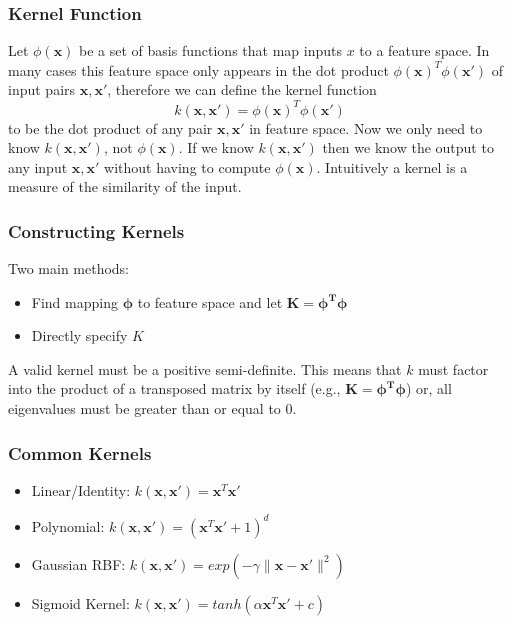 \documentclass[12pt]{article}
\begin{document}
        \subsubsection{Kernel Function}
            Let $\phi(\boldsymbol{x})$ be a set of basis functions that map inputs $x$ to a feature space. In many cases
            this feature space only appears in the dot product $\phi(\boldsymbol{x})^T \phi(\boldsymbol{x}')$ of input
            pairs $\boldsymbol{x}, \boldsymbol{x}'$, therefore we can define the kernel function
            $$ k(\boldsymbol{x}, \boldsymbol{x}') = \phi(\boldsymbol{x})^T \phi(\boldsymbol{x}') $$
            to be the dot product of any pair  $\boldsymbol{x}, \boldsymbol{x}'$ in feature space. Now we only need to
            know $k(\boldsymbol{x}, \boldsymbol{x}')$, not $\phi(\boldsymbol{x})$. If we know $k(\boldsymbol{x},
            \boldsymbol{x}')$ then we know the output to any input $\boldsymbol{x}, \boldsymbol{x}'$ without having to
            compute $\phi(\boldsymbol{x})$. Intuitively a kernel is a measure of the similarity of the input.

        \subsubsection{Constructing Kernels}
            Two main methods:
            \begin{itemize}
                \item Find mapping $\boldsymbol{\phi}$ to feature space and let $\boldsymbol{K = \phi^T \phi}$
                \item Directly specify $K$
            \end{itemize}

            A valid kernel must be a positive semi-definite. This means that $k$ must factor into the product of a
            transposed matrix by itself (e.g., $\boldsymbol{K = \phi^T \phi}$) or, all eigenvalues must be greater than
            or equal to 0.
            
        \subsubsection{Common Kernels}
            \begin{itemize}
                \item Linear/Identity: $k(\boldsymbol{x}, \boldsymbol{x}') = \boldsymbol{x}^T\boldsymbol{x}'$
                \item Polynomial: $k(\boldsymbol{x}, \boldsymbol{x}') = (\boldsymbol{x}^T\boldsymbol{x}' + 1)^d$
                \item Gaussian RBF: $k(\boldsymbol{x}, \boldsymbol{x}') = exp(-\gamma \|\boldsymbol{x} - \boldsymbol{x}'\|^2)$
                \item Sigmoid Kernel: $k(\boldsymbol{x}, \boldsymbol{x}') = tanh(\alpha \boldsymbol{x}^T\boldsymbol{x}' + c)$
            \end{itemize}
\end{document}
